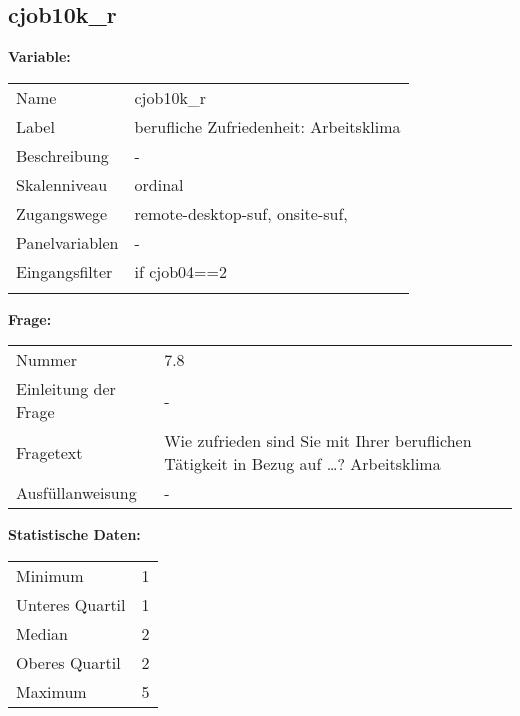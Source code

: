 	
	
	\subsection{cjob10k\_r}
	\label{subSection:cjob10k_r}

	\noindent\textbf{Variable:}\\
		\begin{tabular}{lL{11.3cm}}
			\label{tableVariable:cjob10k_r}
			Name & cjob10k\_r \\
			Label & berufliche Zufriedenheit: Arbeitsklima \\
			Beschreibung & - \\
			Skalenniveau & ordinal \\
			Zugangswege &
				remote-desktop-suf,
				onsite-suf,
 \\
			Panelvariablen & -
			 \\
			Eingangsfilter & if cjob04==2 \\
 \\
		\end{tabular}

		\vspace*{1 cm}
		\noindent\textbf{Frage:}\\
		\begin{tabular}{lL{11.3cm}}
			\label{tableQuestion:cjob10k_r}
			Nummer & 7.8 \\
			Einleitung der Frage & - \\
			Fragetext & Wie zufrieden sind Sie mit Ihrer beruflichen Tätigkeit in Bezug auf …?
Arbeitsklima \\
			Ausfüllanweisung & - \\
		\end{tabular}


		\vspace*{1 cm}
		\noindent\textbf{Statistische Daten:}\\
			\begin{tabular}{ll}
				\label{tableStatistics:cjob10k_r}
					Minimum & 1 \\
					Unteres Quartil & 1 \\
					Median & 2 \\
					Oberes Quartil & 2 \\
					Maximum & 5 \\
			\end{tabular}



